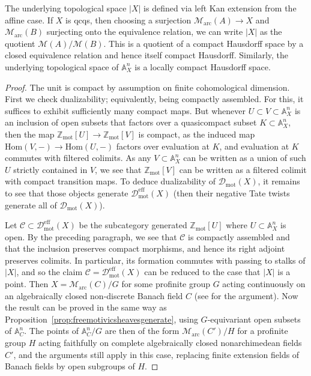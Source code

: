 \documentclass[11pt]{amsart}
\numberwithin{equation}{section}
\numberwithin{theorem}{section}
\theoremstyle{definition}
\begin{document}
The underlying topological space $|X|$ is defined via left Kan extension from the affine case. If $X$ is qcqs, then choosing a surjection $\mathcal M_{\mathrm{arc}}(A)\to X$ and $\mathcal M_{\mathrm{arc}}(B)$ surjecting onto the equivalence relation, we can write $|X|$ as the quotient $\mathcal M(A)/\mathcal M(B)$. This is a quotient of a compact Hausdorff space by a closed equivalence relation and hence itself compact Hausdorff. Similarly, the underlying topological space of $\mathbb A^n_X$ is a locally compact Hausdorff space.

\begin{proof} The unit is compact by assumption on finite cohomological dimension. First we check dualizability; equivalently, being compactly assembled. For this, it suffices to exhibit sufficiently many compact maps. But whenever $U\subset V\subset \mathbb A^n_X$ is an inclusion of open subsets that factors over a quasicompact subset $K\subset \mathbb A^n_X$, then the map $\mathbb Z_{\mathrm{mot}}[U]\to \mathbb Z_{\mathrm{mot}}[V]$ is compact, as the induced map $\mathrm{Hom}(V,-)\to \mathrm{Hom}(U,-)$ factors over evaluation at $K$, and evaluation at $K$ commutes with filtered colimits. As any $V\subset \mathbb A^n_X$ can be written as a union of such $U$ strictly contained in $V$, we see that $\mathbb Z_{\mathrm{mot}}[V]$ can be written as a filtered colimit with compact transition maps. To deduce dualizability of $\mathcal D_{\mathrm{mot}}(X)$, it remains to see that those objects generate $\mathcal D_{\mathrm{mot}}^{\mathrm{eff}}(X)$ (then their negative Tate twists generate all of $\mathcal D_{\mathrm{mot}}(X)$).

Let $\mathcal C\subset \mathcal D_{\mathrm{mot}}^{\mathrm{eff}}(X)$ be the subcategory generated $\mathbb Z_{\mathrm{mot}}[U]$ where $U\subset \mathbb A^n_X$ is open. By the preceding paragraph, we see that $\mathcal C$ is compactly assembled and that the inclusion preserves compact morphisms, and hence its right adjoint preserves colimits. In particular, its formation commutes with passing to stalks of $|X|$, and so the claim $\mathcal C=\mathcal D_{\mathrm{mot}}^{\mathrm{eff}}(X)$ can be reduced to the case that $|X|$ is a point. Then $X=\mathcal M_{\mathrm{arc}}(C)/G$ for some profinite group $G$ acting continuously on an algebraically closed non-discrete Banach field $C$ (see \cite[Proposition 21.9]{ECoD} for the argument). Now the result can be proved in the same way as Proposition~\ref{prop:freemotivicsheavesgenerate}, using $G$-equivariant open subsets of $\mathbb A^n_C$. The points of $\mathbb A^n_C/G$ are then of the form $\mathcal M_{\mathrm{arc}}(C')/H$ for a profinite group $H$ acting faithfully on complete algebraically closed nonarchimedean fields $C'$, and the arguments still apply in this case, replacing finite extension fields of Banach fields by open subgroups of $H$.


\end{proof}
\end{document}

